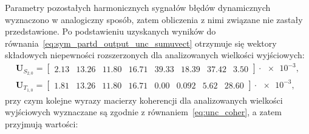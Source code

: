 Parametry pozostałych harmonicznych sygnałów błędów dynamicznych wyznaczono w analogiczny sposób, zatem obliczenia z nimi związane nie zastały przedstawione. Po podstawieniu uzyskanych wyników do równania~\eqref{eq:sym_partd_output_unc_sumuvect} otrzymuje się wektory składowych niepewności rozszerzonych dla analizowanych wielkości wyjściowych:
\begin{gather}
\mathbf{U}_{S_{2,0}} =
\begin{bmatrix}
\num{2.13} & \num{13.26} & \num{11.80} & \num{16.71} & \num{39.33} & \num{18.39} & \num{37.42} & \num{3.50}
\end{bmatrix} \cdot \num{e-3}
\label{eq:sym_partd_output_unc_sumuvect_S_2_0_b}, \\
\mathbf{U}_{T_{1,0}} =
\begin{bmatrix}
\num{1.81} & \num{13.26} & \num{11.80} & \num{16.71} & \num{0.00} & \num{0.092} & \num{5.62} & \num{28.60}
\end{bmatrix} \cdot \num{e-3}
\label{eq:sym_partd_output_unc_sumuvect_T_1_0_b},
\end{gather}
przy czym kolejne wyrazy macierzy koherencji dla analizowanych wielkości wyjściowych wyznaczane są zgodnie z równaniem~\eqref{eq:unc_coher}, a zatem przyjmują wartości:
